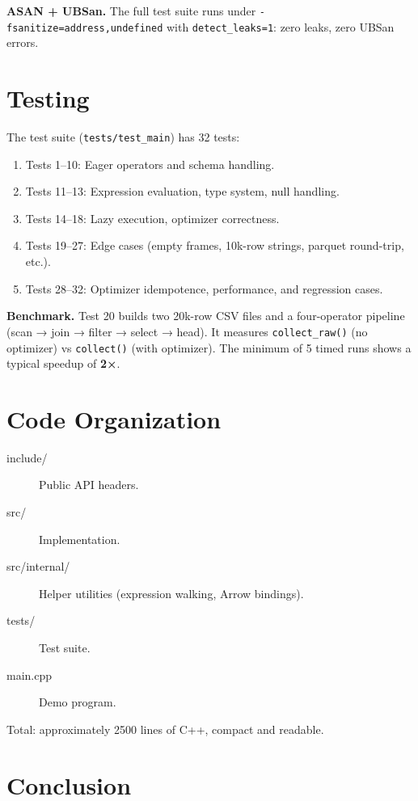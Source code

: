 \documentclass[11pt]{article}
\begin{document}
\textbf{ASAN + UBSan.} The full test suite runs under 
\texttt{-fsanitize=address,undefined} with \texttt{detect\_leaks=1}: zero 
leaks, zero UBSan errors.

\section{Testing}

The test suite (\texttt{tests/test\_main}) has 32 tests:

\begin{enumerate}
  \item Tests 1--10: Eager operators and schema handling.
  \item Tests 11--13: Expression evaluation, type system, null handling.
  \item Tests 14--18: Lazy execution, optimizer correctness.
  \item Tests 19--27: Edge cases (empty frames, 10k-row strings, parquet 
    round-trip, etc.).
  \item Tests 28--32: Optimizer idempotence, performance, and regression cases.
\end{enumerate}

\textbf{Benchmark.} Test 20 builds two 20k-row CSV files and a four-operator 
pipeline (scan → join → filter → select → head). It measures \texttt{collect\_raw()} 
(no optimizer) vs \texttt{collect()} (with optimizer). The minimum of 5 timed 
runs shows a typical speedup of \textbf{2×}.

\section{Code Organization}

\begin{description}
  \item[include/] Public API headers.
  \item[src/] Implementation.
  \item[src/internal/] Helper utilities (expression walking, Arrow bindings).
  \item[tests/] Test suite.
  \item[main.cpp] Demo program.
\end{description}

Total: approximately 2500 lines of C++, compact and readable.

\section{Conclusion}
\end{document}
